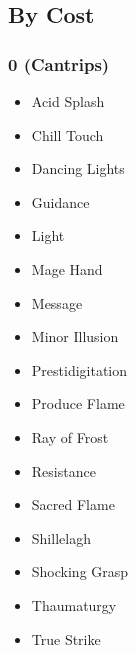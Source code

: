 \subsection{By Cost}

\subsubsection{0 (Cantrips)}
\begin{itemize}
\item Acid Splash
\item Chill Touch
\item Dancing Lights
\item Guidance
\item Light
\item Mage Hand
\item Message
\item Minor Illusion
\item Prestidigitation
\item Produce Flame
\item Ray of Frost
\item Resistance
\item Sacred Flame
\item Shillelagh
\item Shocking Grasp
\item Thaumaturgy
\item True Strike %
\end{itemize}

